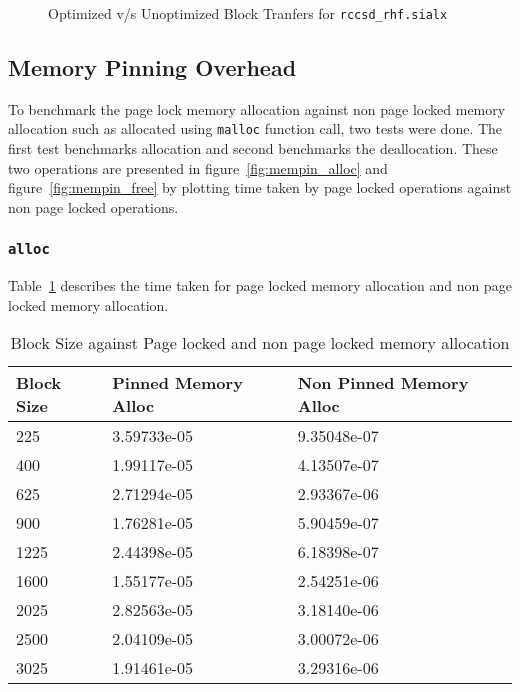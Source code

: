 \begin{figure}[h]
  
  \caption{Optimized v/s Unoptimized Block Tranfers for \texttt{rccsd\_rhf.sialx}}
  \label{fig:optimized_block_transfer}
\end{figure}

\subsection{Memory Pinning Overhead}
To benchmark the page lock memory allocation against non page locked memory allocation
such as allocated using \texttt{malloc} function call, two tests were done. The
first test benchmarks allocation and second benchmarks the deallocation. These two
operations are presented in figure~\ref{fig:mempin_alloc} and figure~\ref{fig:mempin_free}
by plotting time taken by page locked operations against non page locked operations.

\subsubsection{\texttt{alloc}}
Table~\ref{tab:mempin_alloc} describes the time taken for page locked memory allocation
and non page locked memory allocation.
\begin{table}[h]
  \centering
  \begin{tabular}{l | l | l}
    \hline
    Block Size & Pinned Memory Alloc & Non Pinned Memory Alloc \\
    \hline
    225        & 3.59733e-05         & 9.35048e-07             \\
    400        & 1.99117e-05         & 4.13507e-07             \\
    625        & 2.71294e-05         & 2.93367e-06             \\
    900        & 1.76281e-05         & 5.90459e-07             \\
    1225       & 2.44398e-05         & 6.18398e-07             \\
    1600       & 1.55177e-05         & 2.54251e-06             \\
    2025       & 2.82563e-05         & 3.18140e-06             \\
    2500       & 2.04109e-05         & 3.00072e-06             \\
    3025       & 1.91461e-05         & 3.29316e-06             \\
    \hline
  \end{tabular}
  \caption{Block Size against Page locked and non page locked memory allocation}
  \label{tab:mempin_alloc}
\end{table}


